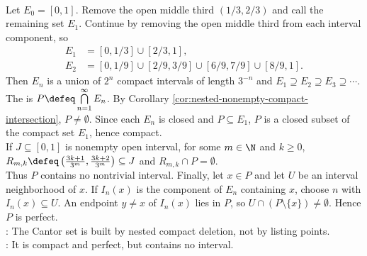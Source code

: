 \begin{example} \label{ex:cantor-set} \\
Let $E_0=[0,1]$. Remove the open middle third $(1/3,2/3)$ and call the remaining set $E_1$. Continue by removing the open middle third from each interval component, so
\begin{align}
E_1&=[0,1/3]\cup[2/3,1], \nonumber\\
E_2&=[0,1/9]\cup[2/9,3/9]\cup[6/9,7/9]\cup[8/9,1]. \nonumber
\end{align}
Then $E_n$ is a union of $2^n$ compact intervals of length $3^{-n}$ and $E_1\supseteq E_2\supseteq E_3\supseteq\cdots$.\\
The  is $P\defeq\bigcap\limits_{n=1}^{\infty}E_n$. By Corollary \ref{cor:nested-nonempty-compact-intersection}, $P\neq\emptyset$. Since each $E_n$ is closed and $P\subseteq E_1$, $P$ is a closed subset of the compact set $E_1$, hence compact.\\
If $J\subseteq[0,1]$ is nonempty open interval, for some $m\in\N$ and $k\geq0$, $R_{m,k}\defeq\left(\frac{3k+1}{3^m},\frac{3k+2}{3^m}\right)\subseteq J$ and $R_{m,k}\cap P=\emptyset$.\\
Thus $P$ contains no nontrivial interval. Finally, let $x\in P$ and let $U$ be an interval neighborhood of $x$. If $I_n(x)$ is the component of $E_n$ containing $x$, choose $n$ with $I_n(x)\subseteq U$. An endpoint $y\neq x$ of $I_n(x)$ lies in $P$, so $U\cap(P\setminus\{x\})\neq\emptyset$. Hence $P$ is perfect.\\
: The Cantor set is built by nested compact deletion, not by listing points.\\
: It is compact and perfect, but contains no interval.
\end{example}
